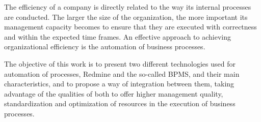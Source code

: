 The efficiency of a company is directly related to the way its internal processes are conducted. The larger the size of the organization, the more important its management capacity becomes to ensure that they are executed with correctness and within the expected time frames. An effective approach to achieving organizational efficiency is the automation of business processes.

The objective of this work is to present two different technologies used for automation of processes, Redmine and the so-called BPMS, and their main characteristics, and to propose a way of integration between them, taking advantage of the qualities of both to offer higher management quality, standardization and optimization of resources in the execution of business processes.
